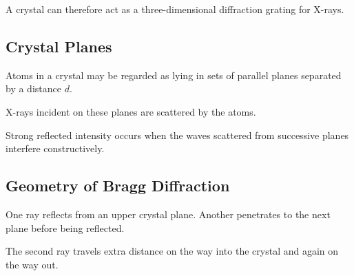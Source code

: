 \documentclass{studentnotes}
\begin{document}
A crystal can therefore act as a three-dimensional diffraction grating for X-rays.

\subsection{Crystal Planes}

Atoms in a crystal may be regarded as lying in sets of parallel planes separated by a distance \(d\).

X-rays incident on these planes are scattered by the atoms.

Strong reflected intensity occurs when the waves scattered from successive planes interfere constructively.

\subsection{Geometry of Bragg Diffraction}

\begin{center}
\end{center}

One ray reflects from an upper crystal plane. Another penetrates to the next plane before being reflected.

The second ray travels extra distance on the way into the crystal and again on the way out.
\end{document}
